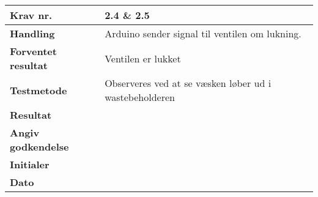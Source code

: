 	\begin{center}
		\begin{longtable}{ | m{4cm}| m{8.5cm}|} 
			\hline
			\textbf{Krav nr.} & 2.4 \& 2.5  \\ 
			\hline
			\textbf{Handling} & Arduino sender signal til ventilen om lukning.   \\
			\hline
			\textbf{Forventet resultat} & Ventilen er lukket \\
			\hline
			\textbf{Testmetode}  & Observeres ved at se væsken løber ud i wastebeholderen  \\
			\hline
			\textbf{Resultat}  &    \\
			\hline
			\textbf{Angiv godkendelse} &     \\
			\hline
			\textbf{Initialer} &     \\
			\hline
			\textbf{Dato} &    \\
			\hline
		\end{longtable}
	\end{center}	
	
